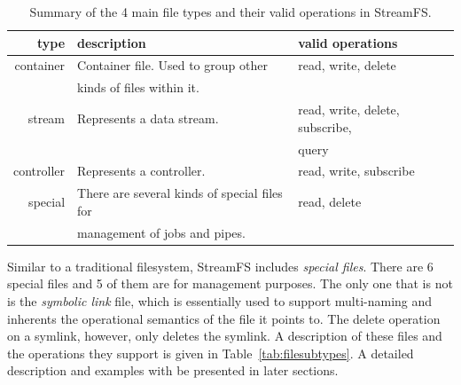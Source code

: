 \begin{table}[h]
\begin{center}
\begin{tabular}{| r | l | l |}
	\hline
	\textbf{type} & \textbf{description} & \textbf{valid operations} \\ \hline
	container & Container file.  Used to group other  & read, write, delete  \\
				   & kinds of files within it.  &  \\ \hline

	stream & Represents a data stream. & read, write, delete, subscribe, \\
			&							&query \\ \hline

	controller & Represents a controller. & read, write, subscribe \\ \hline

	special & There are several kinds of special files for  & read, delete \\
		    & management of jobs and pipes. &  \\ 
	\hline
\end{tabular}
\caption{Summary of the 4 main file types and their valid operations in StreamFS.}
\label{tab:filetypes}
\end{center}
\end{table}

Similar to a traditional filesystem, StreamFS includes \emph{special files}.  There are 6 special files and 5 of them 
are for management purposes.  The only one that is not is the \emph{symbolic link} file, which is essentially used to support
multi-naming and inherents the operational semantics of the file it points to.  The delete operation on a symlink, however,
only deletes the symlink.  A description of these files and the operations they support is given in Table~\ref{tab:filesubtypes}.
A detailed description and examples with be presented in later sections.


